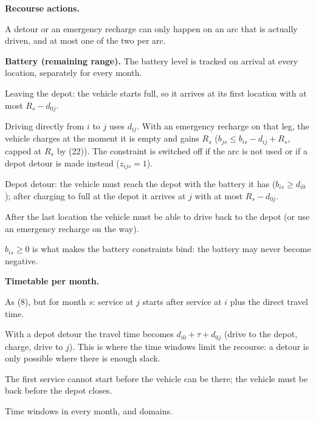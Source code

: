 \documentclass[11pt,a4paper]{article}
\theoremstyle{definition}
\begin{document}
\textbf{Recourse actions.}
\begin{description}[leftmargin=1.1cm,style=sameline,font=\normalfont\bfseries]
\item[(14)] A detour or an emergency recharge can only happen on an arc that is actually driven, and at most one of the two per arc.
\end{description}

\textbf{Battery (remaining range).} The battery level is tracked on arrival at every location, separately for every month.
\begin{description}[leftmargin=1.1cm,style=sameline,font=\normalfont\bfseries]
\item[(15)] Leaving the depot: the vehicle starts full, so it arrives at its first location with at most $R_s-d_{0j}$.
\item[(16)] Driving directly from $i$ to $j$ uses $d_{ij}$. With an emergency recharge on that leg, the vehicle charges at the moment it is empty and gains $R_s$ ($b_{js}\le b_{is}-d_{ij}+R_s$, capped at $R_s$ by (22)). The constraint is switched off if the arc is not used or if a depot detour is made instead ($z_{ijs}=1$).
\item[(17)] Depot detour: the vehicle must reach the depot with the battery it has ($b_{is}\ge d_{i0}$); after charging to full at the depot it arrives at $j$ with at most $R_s-d_{0j}$.
\item[(18)] After the last location the vehicle must be able to drive back to the depot (or use an emergency recharge on the way).
\item[(22)] $b_{is}\ge0$ is what makes the battery constraints bind: the battery may never become negative.
\end{description}

\textbf{Timetable per month.}
\begin{description}[leftmargin=1.1cm,style=sameline,font=\normalfont\bfseries]
\item[(19)] As (8), but for month $s$: service at $j$ starts after service at $i$ plus the direct travel time.
\item[(20)] With a depot detour the travel time becomes $d_{i0}+\tau+d_{0j}$ (drive to the depot, charge, drive to $j$). This is where the time windows limit the recourse: a detour is only possible where there is enough slack.
\item[(21)] The first service cannot start before the vehicle can be there; the vehicle must be back before the depot closes.
\item[(22)] Time windows in every month, and domains.
\end{description}
\end{document}
